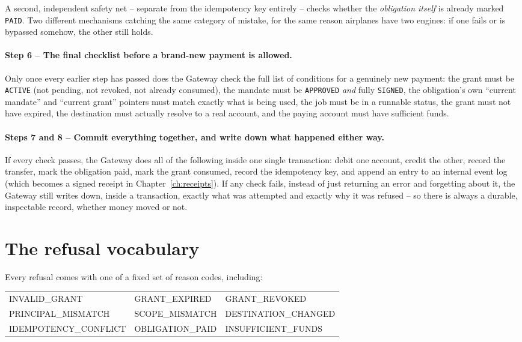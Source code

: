 \documentclass[11pt]{report}
\newcommand{\code}[1]{\texttt{#1}}
\begin{document}
A second, independent safety net -- separate from the idempotency key
entirely -- checks whether the \emph{obligation itself} is already
marked \code{PAID}. Two different mechanisms catching the same category
of mistake, for the same reason airplanes have two engines: if one fails
or is bypassed somehow, the other still holds.

\paragraph{Step 6 -- The final checklist before a brand-new payment is allowed.}

Only once every earlier step has passed does the Gateway check the full
list of conditions for a genuinely new payment: the grant must be
\code{ACTIVE} (not pending, not revoked, not already consumed), the
mandate must be \code{APPROVED} \emph{and} fully \code{SIGNED}, the
obligation's own ``current mandate'' and ``current grant'' pointers must
match exactly what is being used, the job must be in a runnable status,
the grant must not have expired, the destination must actually resolve to
a real account, and the paying account must have sufficient funds.

\paragraph{Steps 7 and 8 -- Commit everything together, and write down what happened either way.}

If every check passes, the Gateway does all of the following inside one
single transaction: debit one account, credit the other, record the
transfer, mark the obligation paid, mark the grant consumed, record the
idempotency key, and append an entry to an internal event log (which
becomes a signed receipt in Chapter~\ref{ch:receipts}). If any check
fails, instead of just returning an error and forgetting about it, the
Gateway still writes down, inside a transaction, exactly what was
attempted and exactly why it was refused -- so there is always a durable,
inspectable record, whether money moved or not.

\section{The refusal vocabulary}

Every refusal comes with one of a fixed set of reason codes, including:

\begin{center}
\ttfamily\small
\begin{tabular}{@{}lll@{}}
INVALID\_GRANT & GRANT\_EXPIRED & GRANT\_REVOKED \\
PRINCIPAL\_MISMATCH & SCOPE\_MISMATCH & DESTINATION\_CHANGED \\
IDEMPOTENCY\_CONFLICT & OBLIGATION\_PAID & INSUFFICIENT\_FUNDS \\
\end{tabular}
\end{center}
\end{document}
